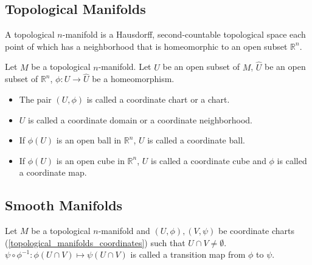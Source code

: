 \subsection{Topological Manifolds}

\begin{defn}
  A topological $n$-manifold is a Hausdorff, second-countable topological space each point of which has a neighborhood that is homeomorphic to an open subset $\mathbb{R}^n$.
\end{defn}

\begin{defn}[Coordinates]\label{topological_manifolds_coordinates}
  Let $M$ be a topological $n$-manifold.
  Let $U$ be an open subset of $M$, $\hat{U}$ be an open subset of $\mathbb{R}^n$, $\phi: U \rightarrow \hat{U}$ be a homeomorphism.
  \begin{itemize}
    \item
      The pair $(U, \phi)$ is called a coordinate chart or a chart.
    \item
      $U$ is called a coordinate domain or a coordinate neighborhood.
    \item
      If $\phi(U)$ is an open ball in $\mathbb{R}^n$, $U$ is called a coordinate ball.
    \item
      If $\phi(U)$ is an open cube in $\mathbb{R}^n$, $U$ is called a coordinate cube and $\phi$ is called a coordinate map.
  \end{itemize}
\end{defn}

\subsection{Smooth Manifolds}

\begin{defn}
  Let $M$ be a topological $n$-manifold and $(U, \phi), (V, \psi)$ be coordinate charts (\ref{topological_manifolds_coordinates}) such that $U \cap V \ne \emptyset$.
  $\psi \circ \phi^{-1}: \phi(U \cap V) \mapsto \psi(U \cap V)$ is called a transition map from $\phi$ to $\psi$.
\end{defn}
